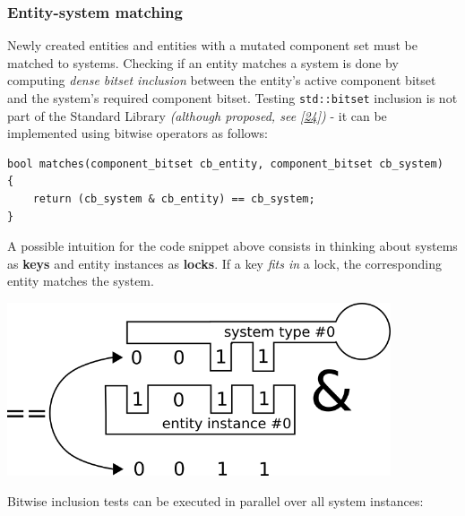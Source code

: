\documentclass[oneside, 12pt, a4paper, openany]{book}
\let\origfigure=\figure
\let\endorigfigure=\endfigure
\renewenvironment{figure}[1][]{%
\origfigure[H]
}{%
\endorigfigure
}
\begin{document}
\subsubsection{Entity-system matching}\label{entity-system-matching}

Newly created entities and entities with a mutated component set must be
matched to systems. Checking if an entity matches a system is done by
computing \emph{dense bitset inclusion} between the entity's active
component bitset and the system's required component bitset. Testing
\texttt{std::bitset}
inclusion is not part of the Standard Library \emph{(although proposed,
see {[}\protect\hyperlink{ref-isocpp_proposal_p0125r0}{24}{]})} - it can
be implemented using bitwise operators as follows:

\begin{verbatim}
bool matches(component_bitset cb_entity, component_bitset cb_system)
{
    return (cb_system & cb_entity) == cb_system;
}
\end{verbatim}

A possible intuition for the code snippet above consists in thinking
about systems as \textbf{keys} and entity instances as \textbf{locks}.
If a key \emph{fits in} a lock, the corresponding entity matches the
system.

\begin{figure}[htbp]
\centering
\includegraphics[width=0.85000\textwidth]{source/figures/keylock.png}
\caption{ECST flow: key/lock entity/system matching
intuition}\label{keylock}
\end{figure}

Bitwise inclusion tests can be executed in parallel over all system
instances:
\end{document}
